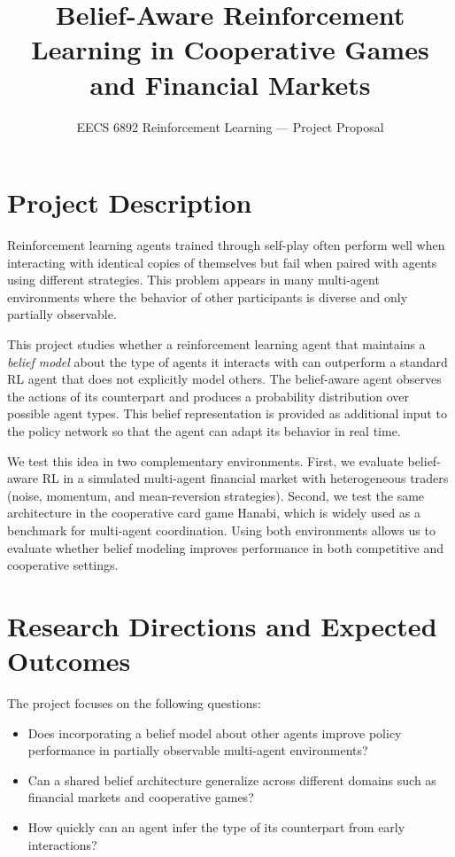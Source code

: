 \documentclass[11pt]{article}
\title{\textbf{Belief-Aware Reinforcement Learning in Cooperative Games and Financial Markets}}
\author{EECS 6892 Reinforcement Learning --- Project Proposal}
\date{}
\begin{document}
\maketitle

\section*{Project Description}

Reinforcement learning agents trained through self-play often perform well when interacting with identical copies of themselves but fail when paired with agents using different strategies. This problem appears in many multi-agent environments where the behavior of other participants is diverse and only partially observable. 

This project studies whether a reinforcement learning agent that maintains a \textit{belief model} about the type of agents it interacts with can outperform a standard RL agent that does not explicitly model others. The belief-aware agent observes the actions of its counterpart and produces a probability distribution over possible agent types. This belief representation is provided as additional input to the policy network so that the agent can adapt its behavior in real time.

We test this idea in two complementary environments. First, we evaluate belief-aware RL in a simulated multi-agent financial market with heterogeneous traders (noise, momentum, and mean-reversion strategies). Second, we test the same architecture in the cooperative card game Hanabi, which is widely used as a benchmark for multi-agent coordination. Using both environments allows us to evaluate whether belief modeling improves performance in both competitive and cooperative settings.

\section*{Research Directions and Expected Outcomes}

The project focuses on the following questions:

\begin{itemize}[leftmargin=*]
\item Does incorporating a belief model about other agents improve policy performance in partially observable multi-agent environments?
\item Can a shared belief architecture generalize across different domains such as financial markets and cooperative games?
\item How quickly can an agent infer the type of its counterpart from early interactions?
\end{itemize}
\end{document}
